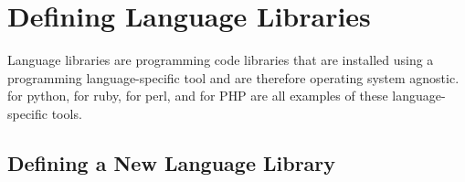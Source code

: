 \documentclass[letterpaper,10pt,english]{manual}
\begin{document}
\resetcurrentobjects
\hypertarget{--doc-gettingstarted/creating_languagelibraries}{}

\hypertarget{gettingstarted-creating-languagelibraries}{}\section{Defining Language Libraries}

Language libraries are programming code libraries that are installed using a programming language-specific tool and are therefore operating system agnostic.  for python,  for ruby,  for perl, and  for PHP are all examples of these language-specific tools.


\subsection{Defining a New Language Library}
\end{document}
